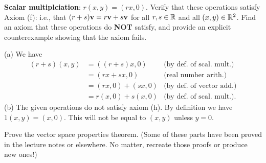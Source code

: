\noindent
{\bf Scalar multiplciation}: $r(x,y)=(rx,0)$. 
\bb
\ii Verify that these operations satisfy Axiom (f): i.e., that $(r+s){\mathbf v}=r{\mathbf v}+s{\mathbf v}$ for all $r,s\in{\mathbb R}$ and all $(x,y)\in{\mathbb R}^2$. 
\ii Find an axiom that these operations do {\bf NOT} satisfy, and provide an explicit counterexample showing that the axiom fails. 
\ee
\begin{solution}
 \noindent
 (a) We have 
 \begin{align*}
 (r+s)(x,y)&=((r+s)x,0) &\text{(by def. of scal. mult.)}\\
 &=(rx+sx,0) &\text{(real number arith.)}\\
 &=(rx,0)+(sx,0) &\text{(by def. of vector add.)}\\
 &=r(x,0)+s(x,0) &\text{(by def. of scal. mult.)}.
 \end{align*}
(b) The given operations do not satisfy axiom (h). By definition we have $1(x,y)=(x,0)$. This will not be equal to $(x,y)$ unless $y=0$. 
 \end{solution}
\ii Prove the vector space properties theorem. (Some of these parts have been proved in the lecture notes or elsewhere. No matter, recreate those proofs or produce new ones!) 
\\
